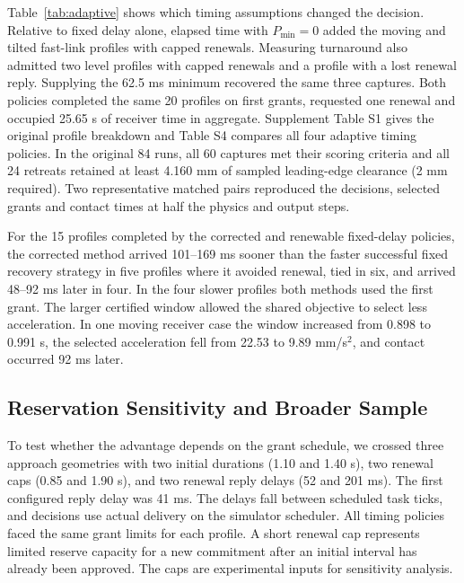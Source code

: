 \documentclass{IEEEtaes}
\begin{document}
Table~\ref{tab:adaptive} shows which timing assumptions changed the decision. Relative to fixed delay alone, elapsed time with $P_{\min}=0$ added the moving and tilted fast-link profiles with capped renewals. Measuring turnaround also admitted two level profiles with capped renewals and a profile with a lost renewal reply. Supplying the 62.5 ms minimum recovered the same three captures. Both policies completed the same 20 profiles on first grants, requested one renewal and occupied 25.65 s of receiver time in aggregate. Supplement Table S1 gives the original profile breakdown and Table S4 compares all four adaptive timing policies. In the original 84 runs, all 60 captures met their scoring criteria and all 24 retreats retained at least 4.160 mm of sampled leading-edge clearance (2 mm required). Two representative matched pairs reproduced the decisions, selected grants and contact times at half the physics and output steps.

For the 15 profiles completed by the corrected and renewable fixed-delay policies, the corrected method arrived 101--169 ms sooner than the faster successful fixed recovery strategy in five profiles where it avoided renewal, tied in six, and arrived 48--92 ms later in four. In the four slower profiles both methods used the first grant. The larger certified window allowed the shared objective to select less acceleration. In one moving receiver case the window increased from 0.898 to 0.991 s, the selected acceleration fell from 22.53 to 9.89 mm/s$^2$, and contact occurred 92 ms later.

\subsection{Reservation Sensitivity and Broader Sample}

To test whether the advantage depends on the grant schedule, we crossed three approach geometries with two initial durations (1.10 and 1.40 s), two renewal caps (0.85 and 1.90 s), and two renewal reply delays (52 and 201 ms). The first configured reply delay was 41 ms. The delays fall between scheduled task ticks, and decisions use actual delivery on the simulator scheduler. All timing policies faced the same grant limits for each profile. A short renewal cap represents limited reserve capacity for a new commitment after an initial interval has already been approved. The caps are experimental inputs for sensitivity analysis.
\end{document}
